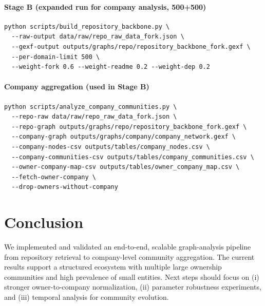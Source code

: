 \documentclass[11pt]{article}
\begin{document}
\paragraph{Stage B (expanded run for company analysis, 500+500)}
\begin{verbatim}
python scripts/build_repository_backbone.py \
  --raw-output data/raw/repo_raw_data_fork.json \
  --gexf-output outputs/graphs/repo/repository_backbone_fork.gexf \
  --per-domain-limit 500 \
  --weight-fork 0.6 --weight-readme 0.2 --weight-dep 0.2
\end{verbatim}

\paragraph{Company aggregation (used in Stage B)}
\begin{verbatim}
python scripts/analyze_company_communities.py \
  --repo-raw data/raw/repo_raw_data_fork.json \
  --repo-graph outputs/graphs/repo/repository_backbone_fork.gexf \
  --company-graph outputs/graphs/company/company_network.gexf \
  --company-nodes-csv outputs/tables/company_nodes.csv \
  --company-communities-csv outputs/tables/company_communities.csv \
  --owner-company-map-csv outputs/tables/owner_company_map.csv \
  --fetch-owner-company \
  --drop-owners-without-company
\end{verbatim}

\section{Conclusion}
We implemented and validated an end-to-end, scalable graph-analysis pipeline from repository retrieval to company-level community aggregation.
The current results support a structured ecosystem with multiple large ownership communities and high prevalence of small entities.
Next steps should focus on (i) stronger owner-to-company normalization, (ii) parameter robustness experiments, and (iii) temporal analysis for community evolution.
\end{document}

